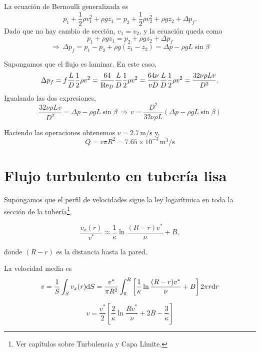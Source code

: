 \begin{center}
	
\end{center}

La ecuación de Bernoulli generalizada es
\[
p_1 + \frac{1}{2}\rho v_1^2 + \rho g z_1 = p_2 + \frac{1}{2} \rho v_2^2 + \rho g z_2 + \Delta p_f.
\]
Dado que no hay cambio de sección, $v_1 = v_2$, y la ecuación queda como
\[
p_1 + \rho g z_1 = p_2 + \rho g z_2 + \Delta p_f
\]
\[
\Rightarrow \, \Delta p_f = p_1 - p_2 + \rho g (z_1 - z_2) = \Delta p - \rho g L \sin \beta
\]

Supongamos que el flujo es laminar. En este caso,
\[
\Delta p_f  = f \frac{L}{D} \frac{1}{2} \rho v^2 = \frac{64}{\text{Re}_D} \frac{L}{D} \frac{1}{2} \rho v^2 = \frac{64 \nu}{v D} \frac{L}{D} \frac{1}{2} \rho v^2 =
\frac{32 \nu \rho L v}{D^2}.
\]
Igualando las dos expresiones,
\[
\frac{32 \nu \rho L v}{D^2} = \Delta p - \rho g L \sin \beta \, \Rightarrow \, v = \frac{D^2}{32 \nu \rho L} (\Delta p - \rho g L \sin \beta)
\]

Haciendo las operaciones obtenemos $v = 2.7 \, \text{m}/\text{s}$ y,
\[
Q = v \pi R^2 = 7.65\times10^{-3}\,\text{m}^3/\text{s}
\]

\section{Flujo turbulento en tubería lisa}
Supongamos que el perfil de velocidades sigue la ley logarítmica en toda la sección de la tubería\footnote{Ver capítulos sobre Turbulencia y Capa Límite.},

\begin{equation}
	\frac{v_x(r)}{v^*} \approx \frac{1}{\kappa}\ln \frac{(R-r)v^*}{\nu} + B,
\end{equation}

donde $(R-r)$ es la distancia hasta la pared.

\begin{center}
	
\end{center}


La velocidad media es
\[v = \frac{1}{S} \int_S v_x(r) \text{d} S = \frac{v^*}{\pi R^2}
\int_0^R \left[\frac{1}{\kappa}\ln \frac{(R-r)v^*}{\nu} + B\right] 2\pi r \text{d} r
\]

\begin{equation}
	v = \frac{v^*}{2} \left[\frac{2}{\kappa} \ln \frac{R v^*}{\nu} + 2B - \frac{3}{\kappa} \right]
\end{equation}


